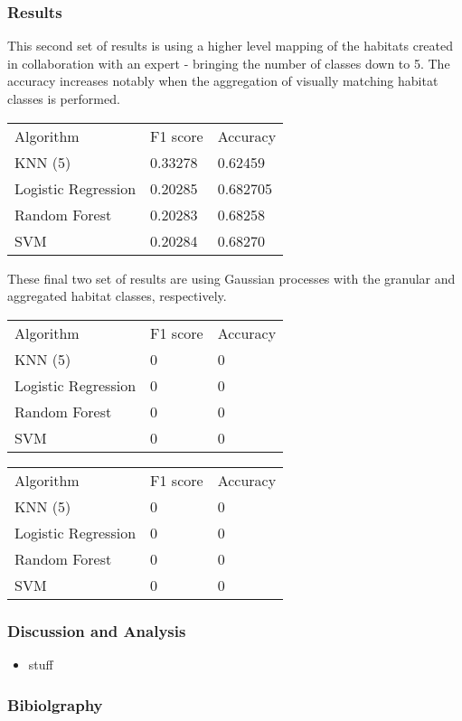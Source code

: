\documentclass{beamer}
\begin{document}
\begin{frame}
    \frametitle{Results}
    This second set of results is using a higher level mapping of the habitats created in collaboration with an expert - bringing the number of classes down to 5. The accuracy increases notably when the aggregation of visually matching habitat classes is performed.

    \begin{tabular}{l | l | l}
        Algorithm & F1 score & Accuracy \\
        KNN (5) & 0.33278 & 0.62459 \\
        Logistic Regression & 0.20285 & 0.682705 \\
        Random Forest & 0.20283 & 0.68258 \\
        SVM & 0.20284 & 0.68270 \\
    \end{tabular}

\end{frame}

\begin{frame}
    These final two set of results are using Gaussian processes with the granular and aggregated habitat classes, respectively.

    \begin{tabular}{l | l | l}
        Algorithm & F1 score & Accuracy \\
        KNN (5) & 0 & 0\\
        Logistic Regression & 0& 0\\
        Random Forest & 0& 0\\
        SVM & 0 & 0\\
    \end{tabular}

    \begin{tabular}{l | l | l}
        Algorithm & F1 score & Accuracy \\
        KNN (5) & 0 & 0\\
        Logistic Regression & 0& 0\\
        Random Forest & 0& 0\\
        SVM & 0 & 0\\
    \end{tabular}
\end{frame}


\begin{frame}
    \frametitle{Discussion and Analysis}
    \begin{itemize}
        \item stuff
    \end{itemize}
\end{frame}

\begin{frame}
    \frametitle{Bibiolgraphy}
    
    
\end{frame}

\end{document}
